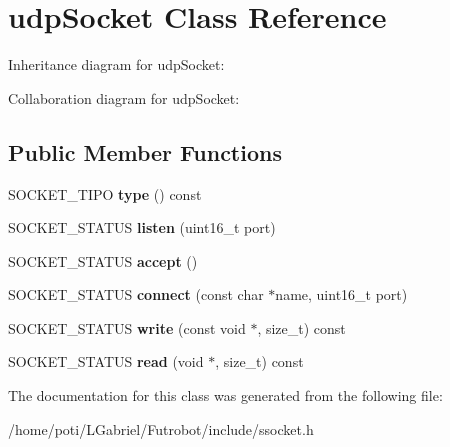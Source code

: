 \hypertarget{classudpSocket}{}\section{udp\+Socket Class Reference}
\label{classudpSocket}


Inheritance diagram for udp\+Socket\+:


Collaboration diagram for udp\+Socket\+:
\subsection*{Public Member Functions}
\begin{DoxyCompactItemize}
\item 
S\+O\+C\+K\+E\+T\+\_\+\+T\+I\+PO {\bfseries type} () const \hypertarget{classudpSocket_a8e614757149e4eaecc3c507c7293c819}{}\label{classudpSocket_a8e614757149e4eaecc3c507c7293c819}

\item 
S\+O\+C\+K\+E\+T\+\_\+\+S\+T\+A\+T\+US {\bfseries listen} (uint16\+\_\+t port)\hypertarget{classudpSocket_a11dd3410c939d867a0748164c76c6dff}{}\label{classudpSocket_a11dd3410c939d867a0748164c76c6dff}

\item 
S\+O\+C\+K\+E\+T\+\_\+\+S\+T\+A\+T\+US {\bfseries accept} ()\hypertarget{classudpSocket_a369fdfa558d0f3fb8ee189938bd899f5}{}\label{classudpSocket_a369fdfa558d0f3fb8ee189938bd899f5}

\item 
S\+O\+C\+K\+E\+T\+\_\+\+S\+T\+A\+T\+US {\bfseries connect} (const char $\ast$name, uint16\+\_\+t port)\hypertarget{classudpSocket_a547cd46c9297e02e847651cc1683ebb0}{}\label{classudpSocket_a547cd46c9297e02e847651cc1683ebb0}

\item 
S\+O\+C\+K\+E\+T\+\_\+\+S\+T\+A\+T\+US {\bfseries write} (const void $\ast$, size\+\_\+t) const \hypertarget{classudpSocket_a37f01b283efabb033806c9fbc72638c8}{}\label{classudpSocket_a37f01b283efabb033806c9fbc72638c8}

\item 
S\+O\+C\+K\+E\+T\+\_\+\+S\+T\+A\+T\+US {\bfseries read} (void $\ast$, size\+\_\+t) const \hypertarget{classudpSocket_ac0ffbc148af5d3034f0a04692acf930b}{}\label{classudpSocket_ac0ffbc148af5d3034f0a04692acf930b}

\end{DoxyCompactItemize}


The documentation for this class was generated from the following file\+:\begin{DoxyCompactItemize}
\item 
/home/poti/\+L\+Gabriel/\+Futrobot/include/ssocket.\+h\end{DoxyCompactItemize}
